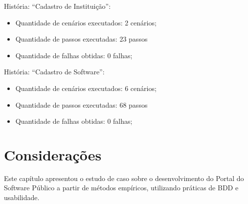 História: ``Cadastro de Instituição'':
\begin{itemize}
	\item Quantidade de cenários executados: 2 cenários;
	\item Quantidade de passos executadas: 23 passos
	\item Quantidade de falhas obtidas: 0 falhas;
\end{itemize} 

História: ``Cadastro de Software'':
\begin{itemize}
	\item Quantidade de cenários executados: 6 cenários;
	\item Quantidade de passos executadas: 68 passos
	\item Quantidade de falhas obtidas: 0 falhas;
\end{itemize} 


\section{Considerações}

Este capítulo apresentou o estudo de caso sobre o desenvolvimento do Portal do Software Público a partir de métodos empíricos, utilizando práticas de BDD e usabilidade.
